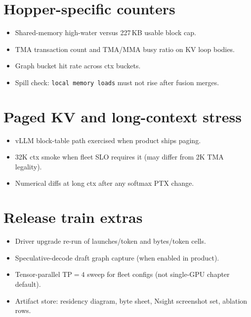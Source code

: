 \section{Hopper-specific counters}
\begin{itemize}
\item Shared-memory high-water versus 227\,KB usable block cap.
\item TMA transaction count and TMA/MMA busy ratio on KV loop bodies.
\item Graph bucket hit rate across ctx buckets.
\item Spill check: \texttt{local memory loads} must not rise after fusion merges.
\end{itemize}

\section{Paged KV and long-context stress}
\begin{itemize}
\item vLLM block-table path exercised when product ships paging.
\item 32K ctx smoke when fleet SLO requires it (may differ from 2K TMA legality).
\item Numerical diffs at long ctx after any softmax PTX change.
\end{itemize}

\section{Release train extras}
\begin{itemize}
\item Driver upgrade re-run of launches/token and bytes/token cells.
\item Speculative-decode draft graph capture (when enabled in product).
\item Tensor-parallel TP$=4$ sweep for fleet configs (not single-GPU chapter default).
\item Artifact store: residency diagram, byte sheet, Nsight screenshot set, ablation rows.
\end{itemize}
